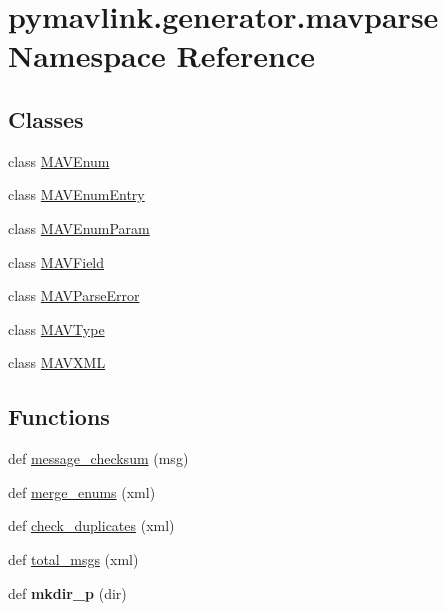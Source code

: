 \hypertarget{namespacepymavlink_1_1generator_1_1mavparse}{}\section{pymavlink.\+generator.\+mavparse Namespace Reference}
\label{namespacepymavlink_1_1generator_1_1mavparse}
\subsection*{Classes}
\begin{DoxyCompactItemize}
\item 
class \hyperlink{classpymavlink_1_1generator_1_1mavparse_1_1MAVEnum}{M\+A\+V\+Enum}
\item 
class \hyperlink{classpymavlink_1_1generator_1_1mavparse_1_1MAVEnumEntry}{M\+A\+V\+Enum\+Entry}
\item 
class \hyperlink{classpymavlink_1_1generator_1_1mavparse_1_1MAVEnumParam}{M\+A\+V\+Enum\+Param}
\item 
class \hyperlink{classpymavlink_1_1generator_1_1mavparse_1_1MAVField}{M\+A\+V\+Field}
\item 
class \hyperlink{classpymavlink_1_1generator_1_1mavparse_1_1MAVParseError}{M\+A\+V\+Parse\+Error}
\item 
class \hyperlink{classpymavlink_1_1generator_1_1mavparse_1_1MAVType}{M\+A\+V\+Type}
\item 
class \hyperlink{classpymavlink_1_1generator_1_1mavparse_1_1MAVXML}{M\+A\+V\+X\+ML}
\end{DoxyCompactItemize}
\subsection*{Functions}
\begin{DoxyCompactItemize}
\item 
def \hyperlink{namespacepymavlink_1_1generator_1_1mavparse_aba7d09994f850b5dce98eb0356318543}{message\+\_\+checksum} (msg)
\item 
def \hyperlink{namespacepymavlink_1_1generator_1_1mavparse_a7547b5a23ef0b60fac86a3dae099723b}{merge\+\_\+enums} (xml)
\item 
def \hyperlink{namespacepymavlink_1_1generator_1_1mavparse_aade73d992c7a3adb54e6ed2682ba97ce}{check\+\_\+duplicates} (xml)
\item 
def \hyperlink{namespacepymavlink_1_1generator_1_1mavparse_a7626b3a261c60c715fcce93281b0c5d0}{total\+\_\+msgs} (xml)
\item 
\mbox{\label{namespacepymavlink_1_1generator_1_1mavparse_aa0e41fa4aa5b31e62663f114f77de9a4}} 
def {\bfseries mkdir\+\_\+p} (dir)
\end{DoxyCompactItemize}
